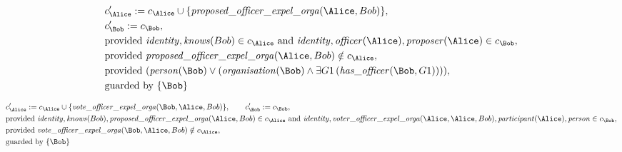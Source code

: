\begin{align*}
&
c'_
{
\Alice
}
 := 
c_
{
\Alice
}
 \cup 
\{
\mathit{\detokenize{
proposed_officer_expel_orga
}}
(
\Alice
,
Bob
)
\}
,\\
&
c'_
{
\Bob
}
 := 
c_
{
\Bob
}
,\\
&
\text{provided } 
\mathit{\detokenize{
identity
}}
,
\mathit{\detokenize{
knows
}}
(
Bob
)
 \in c_
{
\Alice
}
 \text{ and } 
\mathit{\detokenize{
identity
}}
,
\mathit{\detokenize{
officer
}}
(
\Alice
)
,
\mathit{\detokenize{
proposer
}}
(
\Alice
)
 \in c_
{
\Bob
}
,\\
&
\text{provided } 
\mathit{\detokenize{
proposed_officer_expel_orga
}}
(
\Alice
,
Bob
)
 \notin c_
{
\Alice
}
,\\
&
\text{provided } 
(
\mathit{\detokenize{
person
}}
(
\Bob
)
\lor
(
\mathit{\detokenize{
organisation
}}
(
\Bob
)
\land
\exists 
G1
\,(
\mathit{\detokenize{
has_officer
}}
(
\Bob
,
G1
)
)
)
)
,\\
&
\text{guarded by } \{
\Bob
\}
\end{align*}

\begin{align*}
&
c'_
{
\Alice
}
 := 
c_
{
\Alice
}
 \cup 
\{
\mathit{\detokenize{
vote_officer_expel_orga
}}
(
\Bob
,
\Alice
,
Bob
)
\}
, \qquad 
c'_
{
\Bob
}
 := 
c_
{
\Bob
}
,\\
&
\text{provided } 
\mathit{\detokenize{
identity
}}
,
\mathit{\detokenize{
knows
}}
(
Bob
)
,
\mathit{\detokenize{
proposed_officer_expel_orga
}}
(
\Alice
,
Bob
)
 \in c_
{
\Alice
}
 \text{ and } 
\mathit{\detokenize{
identity
}}
,
\mathit{\detokenize{
voter_officer_expel_orga
}}
(
\Alice
,
\Alice
,
Bob
)
,
\mathit{\detokenize{
participant
}}
(
\Alice
)
,
\mathit{\detokenize{
person
}}
 \in c_
{
\Bob
}
,\\
&
\text{provided } 
\mathit{\detokenize{
vote_officer_expel_orga
}}
(
\Bob
,
\Alice
,
Bob
)
 \notin c_
{
\Alice
}
,\\
&
\text{guarded by } \{
\Bob
\}
\end{align*}

